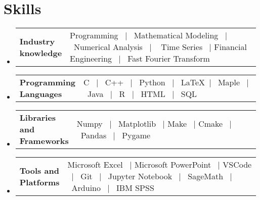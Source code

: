 \documentclass[a4paper,11pt,dvipsnames]{article}
\makeatletter
\newcommand{\resumeSectionTypeOne}[2]{
	\item\begin{tabular*}{0.99\textwidth}[t]{
			p{0.18\linewidth}p{0.81\linewidth}
		}
		\textbf{#1} & #2
	\end{tabular*}\vspace{-2pt}
}
\newcommand{\resumeQuadHeading}[4]{
	\item
	\begin{tabular*}{0.96\textwidth}[t]{l@{\extracolsep{\fill}}r}
		\textbf{#1} & \small #2 \\
		\small#3 & \small #4 \\
	\end{tabular*}
}
\newcommand{\resumeHeadingListStart}{
	\begin{itemize}[leftmargin=0.15in, label={}]
	}
\newcommand{\resumeHeadingListEnd}{\end{itemize}}
\makeatother
\begin{document}
	
	
	
	
	
	
	
	\section{Skills}
	\resumeHeadingListStart{}
	\resumeSectionTypeOne{Industry\hspace{1cm} knowledge}{Programming \ $|$ \ Mathematical Modeling \ $|$ \ Numerical Analysis \ $|$ \ \hspace{2cm} Time Series \ $|$ Financial Engineering \ $|$ \ Fast Fourier Transform}
	\resumeHeadingListEnd{}
	
	\resumeHeadingListStart{}
	\resumeSectionTypeOne{Programming Languages}{C \ $|$ \ C++ \ $|$ \ Python \ $|$ \ \LaTeX \ $|$ \ Maple \ $|$ \ Java \ $|$ \ R \ $|$ \ HTML \ $|$ \ SQL}
	\resumeHeadingListEnd{}
	
	\resumeHeadingListStart{}
	\resumeSectionTypeOne{Libraries and Frameworks}{Numpy \ $|$ \ Matplotlib \ $|$ Make \ $|$ Cmake \ $|$  \ Pandas \ $|$  \ Pygame}
	\resumeHeadingListEnd{}
	
	\resumeHeadingListStart{}
	\resumeSectionTypeOne{Tools and\hspace{0.5cm} Platforms}{Microsoft Excel \ $|$ Microsoft PowerPoint \ $|$ VSCode \ $|$ \ Git  \ $|$ \ Jupyter Notebook \ $|$ \ SageMath \ $|$ \ Arduino \ $|$ \ IBM SPSS}
	\resumeHeadingListEnd{}
	
\end{document}
